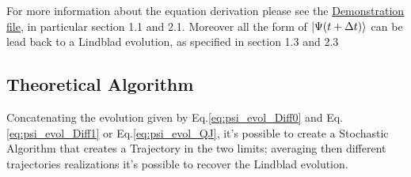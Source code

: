 \documentclass[a4paper,12pt]{article}
\begin{document}
	For more information about the equation derivation please see the \href{run:./Demonstration.pdf}{Demonstration file}, in particular section 1.1 and 2.1. Moreover all the form of $ \ket{\Psi (t + \Delta t) } $ can be lead back to a Lindblad evolution, as specified in section 1.3 and 2.3

	\subsection{Theoretical Algorithm}
	\label{sub:theoretical_algorithm}
	Concatenating the evolution given by Eq.\eqref{eq:psi_evol_Diff0} and Eq.\eqref{eq:psi_evol_Diff1} or Eq.\eqref{eq:psi_evol_QJ}, it's possible to create a Stochastic Algorithm that creates a Trajectory in the two limits; averaging then different trajectories realizations it's possible to recover the Lindblad evolution.
\end{document}
